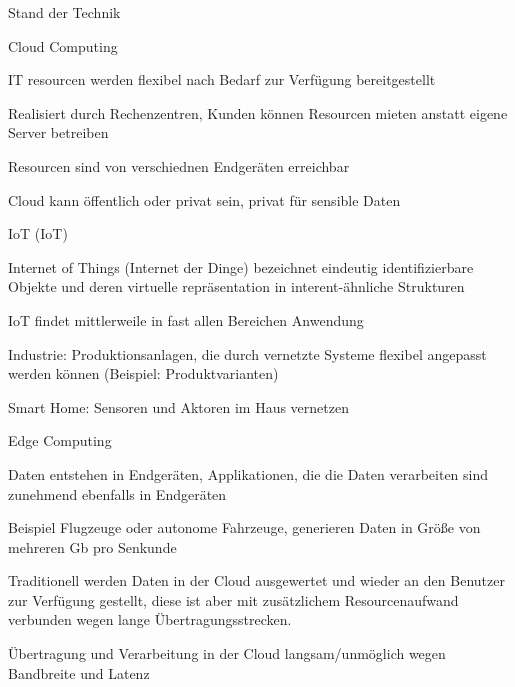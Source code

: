 \begin{notes}
\item Stand der Technik
    \begin{notes}
        \item Cloud Computing
        \begin{notes}
            \item IT resourcen werden flexibel nach Bedarf zur Verfügung bereitgestellt
            \item Realisiert durch Rechenzentren, Kunden können Resourcen mieten anstatt eigene Server betreiben
            \item Resourcen sind von verschiednen Endgeräten erreichbar \cite{Sunyaev2020}
            \item Cloud kann öffentlich oder privat sein, privat für sensible Daten \cite{Ibrahim2021}
        \end{notes}
        \item \gls{IoT} (IoT) 
        \begin{notes}
            \item Internet of Things (Internet der Dinge) bezeichnet eindeutig identifizierbare Objekte und deren virtuelle repräsentation in interent-ähnliche Strukturen\cite{Jie2013} 
            \item IoT findet mittlerweile in fast allen Bereichen Anwendung
            \item Industrie: Produktionsanlagen, die durch vernetzte Systeme flexibel angepasst werden können (Beispiel: Produktvarianten)
            \item Smart Home: Sensoren und Aktoren im Haus vernetzen \cite{Wortmann2015}
        \end{notes}
        \item Edge Computing
        \begin{notes}
            \item Daten entstehen in Endgeräten, Applikationen, die die Daten verarbeiten sind zunehmend ebenfalls in Endgeräten
            \item Beispiel Flugzeuge oder autonome Fahrzeuge, generieren Daten in Größe von mehreren Gb pro Senkunde \cite{Liu2019}
            \item Traditionell werden Daten in der Cloud ausgewertet und wieder an den Benutzer zur Verfügung gestellt, diese ist aber mit zusätzlichem Resourcenaufwand verbunden wegen lange Übertragungsstrecken. \cite{Perez2022} 
            \item Übertragung und Verarbeitung in der Cloud langsam/unmöglich wegen Bandbreite und Latenz

\end{notes}
\end{notes}
\end{notes}
